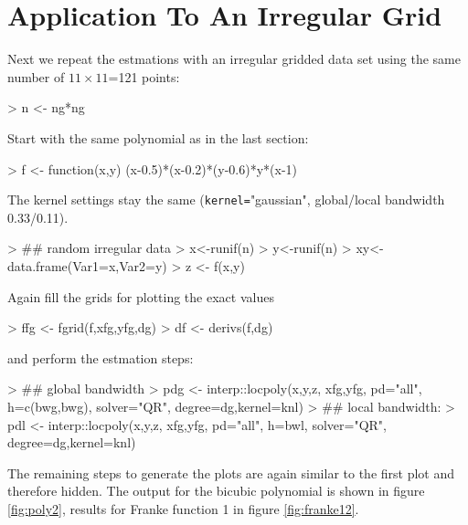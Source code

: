 \documentclass[nojss]{jss}
\def\cmd{\lstinline[basicstyle=\ttfamily,keywordstyle={},breaklines=true,breakatwhitespace=false]}
\begin{document}
\section[Irregular Grid]{Application To An Irregular Grid}
\label{sec:irreg}

Next we repeat the estmations with an irregular gridded data set using the
same number of $11\times11$=121 points:
\begin{Schunk}
\begin{Sinput}
> n <- ng*ng
\end{Sinput}
\end{Schunk}
Start with the same polynomial as in the last section:
\begin{Schunk}
\begin{Sinput}
> f <- function(x,y) (x-0.5)*(x-0.2)*(y-0.6)*y*(x-1)
\end{Sinput}
\end{Schunk}
The kernel settings stay the same (\cmd{kernel=}"gaussian", global/local bandwidth 0.33/0.11).
\begin{Schunk}
\begin{Sinput}
> ## random irregular data
> x<-runif(n)
> y<-runif(n)
> xy<-data.frame(Var1=x,Var2=y)
> z <- f(x,y)
\end{Sinput}
\end{Schunk}
Again fill the grids for plotting the exact values  
\begin{Schunk}
\begin{Sinput}
> ffg <- fgrid(f,xfg,yfg,dg)
> df <- derivs(f,dg)
\end{Sinput}
\end{Schunk}
and perform the estmation steps:
\begin{Schunk}
\begin{Sinput}
> ## global bandwidth
> pdg <- interp::locpoly(x,y,z, xfg,yfg, pd="all", h=c(bwg,bwg), solver="QR", degree=dg,kernel=knl)
> ## local bandwidth:
> pdl <- interp::locpoly(x,y,z, xfg,yfg, pd="all", h=bwl, solver="QR", degree=dg,kernel=knl)
\end{Sinput}
\end{Schunk}
The remaining steps to generate the plots are again similar to the
first plot and therefore hidden. The output for the bicubic polynomial is shown in figure
\ref{fig:poly2}, results for Franke function 1 in figure \ref{fig:franke12}.
\end{document}
